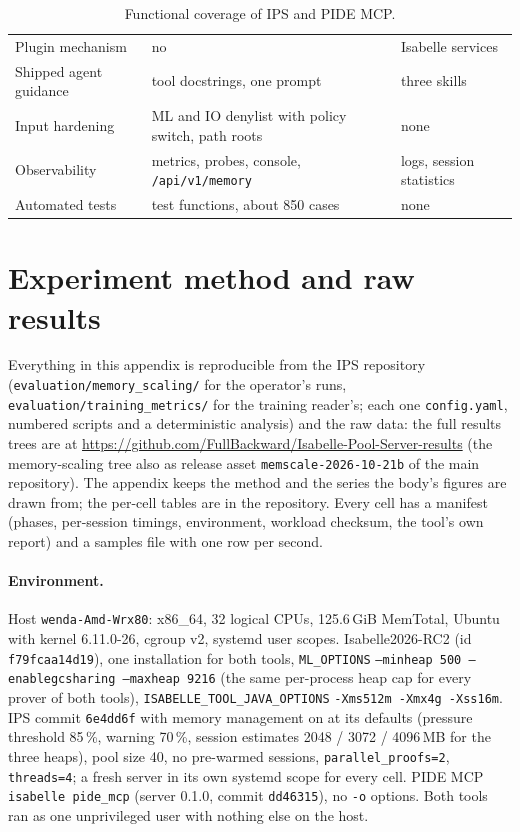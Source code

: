 \documentclass[11pt]{article}
\newcommand{\code}[1]{\colorbox{gray!12}{\texttt{\vphantom{Ag}#1}}}
\begin{document}
\begin{table}[p]
\begin{tabularx}{\textwidth}{@{}>{\raggedright\arraybackslash}p{3.4cm} >{\raggedright\arraybackslash}X >{\raggedright\arraybackslash}X@{}}
Plugin mechanism & no & Isabelle services \\
Shipped agent guidance & tool docstrings, one prompt & three skills \\
Input hardening & ML and IO denylist with policy switch, path roots & none \\
Observability & metrics, probes, console, \texttt{/api/v1/memory} & logs, session statistics \\
Automated tests & 560 test functions, about 850 cases & none \\
\bottomrule
\end{tabularx}
\caption{Functional coverage of IPS and PIDE MCP.}
\label{tab:inventory}
\end{table}

\section{Experiment method and raw results}
\label{app:bench}

Everything in this appendix is reproducible from the IPS repository
(\code{evaluation/memory\_scaling/} for the operator's runs,
\code{evaluation/training\_metrics/} for the training reader's; each
one \code{config.yaml}, numbered scripts and a deterministic analysis)
and the raw data: the full results trees are at
\url{https://github.com/FullBackward/Isabelle-Pool-Server-results}
(the memory-scaling tree also as release asset
\code{memscale-2026-10-21b} of the main repository). The appendix
keeps the method and the series the body's figures are drawn from; the
per-cell tables are in the repository.
Every cell has a manifest (phases, per-session timings, environment,
workload checksum, the tool's own report) and a samples file with one row
per second.

\paragraph{Environment.} Host \code{wenda-Amd-Wrx80}: x86\_64, 32 logical
CPUs, 125.6\,GiB MemTotal, Ubuntu with kernel 6.11.0-26, cgroup v2,
systemd user scopes. Isabelle2026-RC2 (id \code{f79fcaa14d19}), one
installation for both tools, \code{ML\_OPTIONS} \code{--minheap 500
--enablegcsharing --maxheap 9216} (the same per-process heap cap for every
prover of both tools), \code{ISABELLE\_TOOL\_JAVA\_OPTIONS} \code{-Xms512m
-Xmx4g -Xss16m}. IPS commit \code{6e4dd6f} with memory management on at
its defaults (pressure threshold 85\,\%, warning 70\,\%, session
estimates 2048 / 3072 / 4096\,MB for the three heaps), pool size 40,
no pre-warmed sessions, \code{parallel\_proofs=2}, \code{threads=4}; a
fresh server in its own systemd scope for every cell. PIDE MCP
\code{isabelle pide\_mcp} (server 0.1.0, commit \code{dd46315}), no
\code{-o} options. Both
tools ran as one unprivileged user with nothing else on the host.
\end{document}
